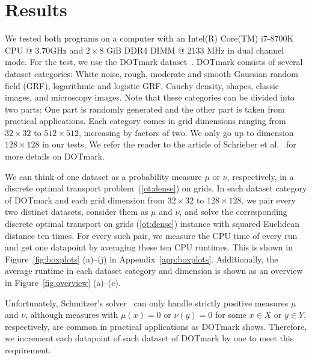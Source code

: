 \documentclass[a4paper,UKenglish,cleveref, autoref, thm-restate]{lipics-v2021}
\begin{document}
\section{Results}\label{sec:res}
We tested both programs on a computer with an Intel(R) Core(TM) i7-8700K CPU @ 3.70GHz and $2 \times 8$ GiB DDR4 DIMM @ 2133 MHz in dual channel mode.
For the test, we use the DOTmark dataset~\cite{schrieber2017dotmark}.
DOTmark consists of several dataset categories: White noise, rough, moderate and smooth Gaussian random field (GRF), logarithmic and logistic GRF, Cauchy density, shapes, classic images, and microscopy images.
Note that these categories can be divided into two parts: One part is randomly generated and the other part is taken from practical applications.
Each category comes in grid dimensions ranging from $32 \times 32$ to $512 \times 512$, increasing by factors of two.
We only go up to dimension $128 \times 128$ in our tests.
We refer the reader to the article of Schrieber et al.~\cite{schrieber2017dotmark} for more details on DOTmark.

We can think of one dataset as a probability measure $\mu$ or $\nu$, respectively, in a discrete optimal transport problem~(\ref{ot:dense}) on grids.
In each dataset category of DOTmark and each grid dimension from $32 \times 32$ to $128 \times 128$, we pair every two distinct datasets, consider them as $\mu$ and $\nu$, and solve the corresponding discrete optimal transport on grids (\ref{ot:dense}) instance with squared Euclidean distance ten times.
For every such pair, we measure the CPU time of every run and get one datapoint by averaging these ten CPU runtimes.
This is shown in Figure~\ref{fig:boxplots} (a)--(j) in Appendix~\ref{app:boxplots}.
Additionally, the average runtime in each dataset category and dimension is shown as an overview in Figure~\ref{fig:overview} (a)--(c).

Unfortunately, Schmitzer's solver~\cite{schmitzer2016sparse} can only handle strictly positive measures $\mu$ and $\nu$, although measures with $\mu(x)=0$ or $\nu(y)=0$ for some $x \in X$ or $y \in Y$, respectively, are common in practical applications as DOTmark shows.
Therefore, we increment each datapoint of each dataset of DOTmark by one to meet this requirement.
\end{document}
